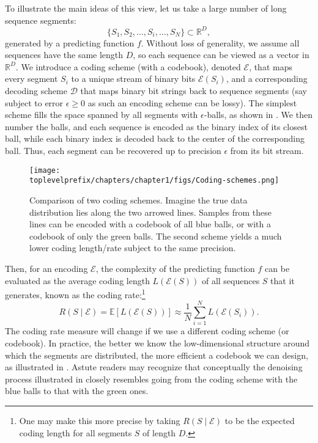 \documentclass[../../book-main.tex]{subfiles}
\begin{document}
To illustrate the main ideas of this view, let us take a large number of long sequence segments:
\begin{equation}
    \{S_1, S_2, \ldots, S_i, \ldots, S_N\} \subset \mathbb{R}^D,
\end{equation}
generated by a predicting function $f$. Without loss of generality, we assume all sequences have the same length $D$, so each sequence can be viewed as a vector in $\mathbb{R}^D$. We introduce a coding scheme (with a codebook), denoted $\mathcal{E}$, that maps every segment $S_i$ to a unique stream of binary bits $\mathcal{E}(S_i)$, and a corresponding decoding scheme $\mathcal{D}$ that maps binary bit strings back to sequence segments (say subject to error $\epsilon \geq 0$ as such an encoding scheme can be lossy). The simplest scheme fills the space spanned by all segments with $\epsilon$-balls, as shown in . We then number the balls, and each sequence is encoded as the binary index of its closest ball, while each binary index is decoded back to the center of the corresponding ball. Thus, each segment can be recovered up to precision $\epsilon$ from its bit stream.
\begin{figure}
    \centering
    \texttt{[image: \\toplevelprefix/chapters/chapter1/figs/Coding-schemes.png]}
    \caption{Comparison of two coding schemes. Imagine the true data distribution lies along the two arrowed lines. Samples from these lines can be encoded with a codebook of all blue balls, or with a codebook of only the green balls. The second scheme yields a much lower coding length/rate subject to the same precision.}
    \label{fig:coding-schemes}
\end{figure}


Then, for an encoding $\mathcal{E}$, the complexity of the predicting function $f$ can be evaluated as the average coding length $L(\mathcal{E}(S))$ of all sequences $S$ that it generates, known as the coding rate:\footnote{One may make this more precise by taking $R(S \mid \mathcal{E})$ to be the expected coding length for all segments $S$ of length $D$.}
\begin{equation}
   R(S \mid \mathcal E) = \mathbb{E}[L(\mathcal{E}(S))] \approx \frac{1}{N}\sum_{i=1}^N L(\mathcal{E}(S_i)). 
   \label{eqn:coding-rate}
\end{equation}
The coding rate measure will change if we use a different coding scheme (or codebook). In practice, the better we know the low-dimensional structure around which the segments are distributed, the more efficient a codebook we can design, as illustrated in . Astute readers may recognize that conceptually the denoising process illustrated in  closely resembles going from the coding scheme with the blue balls to that with the green ones.
\end{document}
